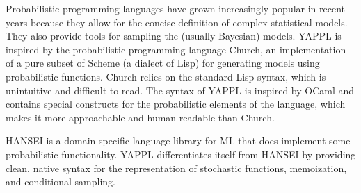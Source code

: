 Probabilistic programming languages have grown increasingly popular in recent years 
because they allow for the concise definition of complex statistical models. They also 
provide tools for sampling the (usually Bayesian) models. YAPPL is inspired by the 
probabilistic programming language Church, an implementation of a pure subset of Scheme 
(a dialect of Lisp) for generating models using probabilistic functions. Church relies 
on the standard Lisp syntax, which is unintuitive and difficult to read. The syntax of 
YAPPL is inspired by OCaml and contains special constructs for the probabilistic 
elements of the language, which makes it more approachable and human-readable than Church. 

HANSEI is a domain specific language library for ML that does implement some probabilistic 
functionality. YAPPL differentiates itself from HANSEI by providing clean, native syntax 
for the representation of stochastic functions, memoization, and conditional sampling. 